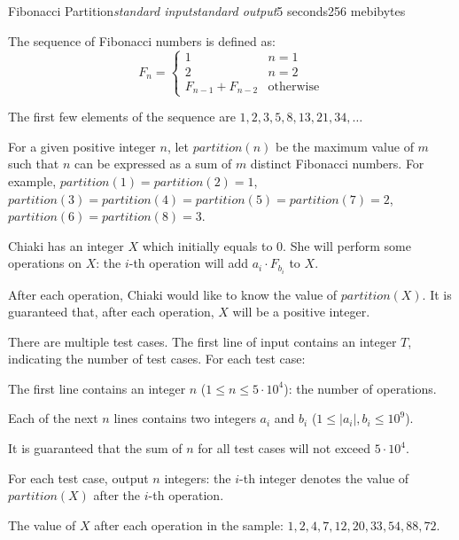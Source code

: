 \begin{problem}{Fibonacci Partition}{\textsl{standard input}}{\textsl{standard output}}{5 seconds}{256 mebibytes}

The sequence of Fibonacci numbers is defined as:
$$
F_n=\begin{cases}
1 & n=1 \\
2 & n=2 \\
F_{n-1}+F_{n-2} & \text{otherwise}
\end{cases}
$$

The first few elements of the sequence are $1, 2, 3, 5, 8, 13, 21, 34, \dots$

For a given positive integer $n$, let $\mathit{partition}(n)$ be the maximum value of $m$ such that $n$ can be expressed as a sum of $m$ distinct Fibonacci numbers.
For example, $\mathit{partition}(1) = \mathit{partition}(2) = 1$, $\mathit{partition}(3) = \mathit{partition}(4) = \mathit{partition}(5) = \mathit{partition}(7) = 2$, $\mathit{partition}(6) = \mathit{partition}(8) = 3$.

Chiaki has an integer $X$ which initially equals to $0$. She will perform some operations on $X$: the $i$-th operation will add $a_i \cdot F_{b_i}$ to $X$. 

After each operation, Chiaki would like to know the value of $\mathit{partition}(X)$. It is guaranteed that, after each operation, $X$ will be a positive integer.

\InputFile
There are multiple test cases. The first line of input contains an integer $T$, indicating the number of test cases. For each test case:

The first line contains an integer $n$ ($1 \le n \le 5 \cdot 10^4$): the number of operations.

Each of the next $n$ lines contains two integers $a_i$ and $b_i$ ($1 \le |a_i|, b_i \le 10^9$).

It is guaranteed that the sum of $n$ for all test cases will not exceed $5 \cdot 10^4$.


\OutputFile
For each test case, output $n$ integers: the $i$-th integer denotes the value of $\mathit{partition}(X)$ after the $i$-th operation.




\Example

\begin{example}
%
\end{example}

\Note
The value of $X$ after each operation in the sample: $1, 2, 4, 7, 12, 20, 33, 54, 88, 72$.

\end{problem}
